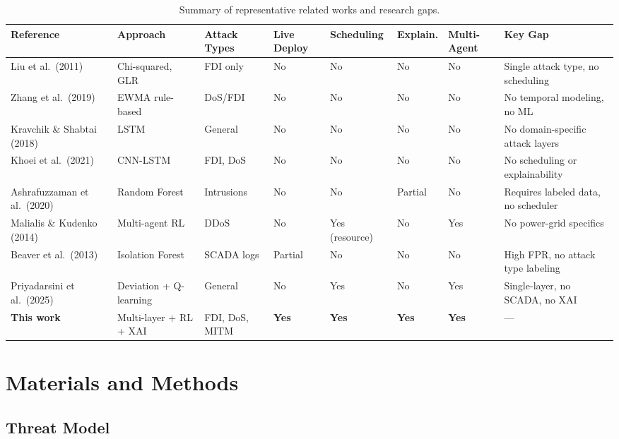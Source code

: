 \begin{table}[htbp]
\centering
\caption{Summary of representative related works and research gaps.}
\label{tab:litgap}
\small
\begin{tabular}{@{}llllllll@{}}
\hline
\textbf{Reference} & \textbf{Approach} & \textbf{Attack Types} & \textbf{Live Deploy} &
\textbf{Scheduling} & \textbf{Explain.} & \textbf{Multi-Agent} & \textbf{Key Gap} \\
\hline
Liu et al.\ (2011)~\cite{liu2011false} & Chi-squared, GLR & FDI only & No & No & No & No & Single attack type, no scheduling \\
Zhang et al.\ (2019)~\cite{zhang2019} & EWMA rule-based & DoS/FDI & No & No & No & No & No temporal modeling, no ML \\
Kravchik \& Shabtai (2018)~\cite{kravchik2018} & LSTM & General & No & No & No & No & No domain-specific attack layers \\
Khoei et al.\ (2021)~\cite{khoei2021} & CNN-LSTM & FDI, DoS & No & No & No & No & No scheduling or explainability \\
Ashrafuzzaman et al.\ (2020)~\cite{ashrafuzzaman2020} & Random Forest & Intrusions & No & No & Partial & No & Requires labeled data, no scheduler \\
Malialis \& Kudenko (2014)~\cite{malialis2014} & Multi-agent RL & DDoS & No & Yes (resource) & No & Yes & No power-grid specifics \\
Beaver et al.\ (2013)~\cite{beaver2013evaluation} & Isolation Forest & SCADA logs & Partial & No & No & No & High FPR, no attack type labeling \\
Priyadarsini et al.\ (2025)~\cite{priyadarsini2025} & Deviation + Q-learning & General & No & Yes & No & Yes & Single-layer, no SCADA, no XAI \\
\hline
\textbf{This work} & Multi-layer + RL + XAI & FDI, DoS, MITM & \textbf{Yes} & \textbf{Yes} & \textbf{Yes} & \textbf{Yes} & --- \\
\hline
\end{tabular}
\end{table}

\section{Materials and Methods}
\label{sec:methods}

\subsection{Threat Model}
\label{sec:threatmodel}

